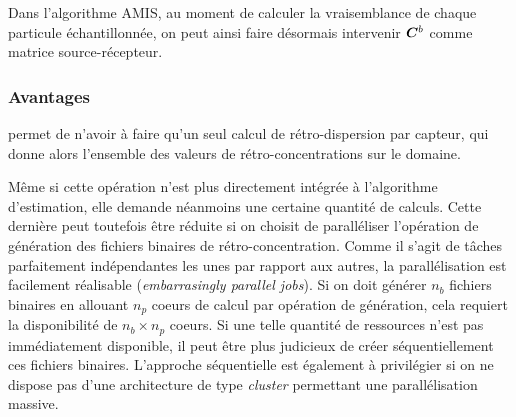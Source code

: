 Dans l'algorithme AMIS, au moment de calculer la vraisemblance de chaque particule échantillonnée, on peut ainsi faire désormais intervenir ${\bm{C}}^b$ comme matrice source-récepteur.

\subsubsection{Avantages}

 permet de n'avoir à faire qu'un seul calcul de rétro-dispersion par capteur, qui donne alors l'ensemble des valeurs de rétro-concentrations sur le domaine. 

Même si cette opération n'est plus directement intégrée à l'algorithme d'estimation, elle demande néanmoins une certaine quantité de calculs. Cette dernière peut toutefois être réduite si on choisit de paralléliser l'opération de génération des fichiers binaires de rétro-concentration. Comme il s'agit de tâches parfaitement indépendantes les unes par rapport aux autres, la parallélisation est facilement réalisable (\textit{embarrasingly parallel jobs}). Si on doit générer $n_b$ fichiers binaires en allouant $n_p$ coeurs de calcul par opération de génération, cela requiert la disponibilité de $n_b \times n_p$ coeurs. Si une telle quantité de ressources n'est pas immédiatement disponible, il peut être plus judicieux de créer séquentiellement ces fichiers binaires. L'approche séquentielle est également à privilégier si on ne dispose pas d'une architecture de type \textit{cluster} permettant une parallélisation massive. \\



